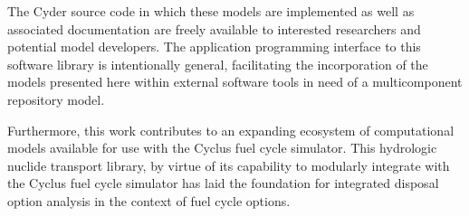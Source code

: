 \documentclass[letterpaper]{article}
\begin{document}
The Cyder source code in which these models are implemented as well as 
associated documentation are freely available to interested researchers and 
potential model developers. The application programming interface to this 
software library is intentionally general, facilitating the incorporation of the 
models presented here within external software tools in need of a multicomponent 
repository model.

Furthermore, this work contributes to an expanding ecosystem of computational 
models available for use with the Cyclus fuel cycle simulator. This hydrologic 
nuclide transport library, by virtue of its capability to modularly integrate 
with the Cyclus fuel cycle simulator has laid the foundation for integrated 
disposal option analysis in the context of fuel cycle options. 
\end{document}
